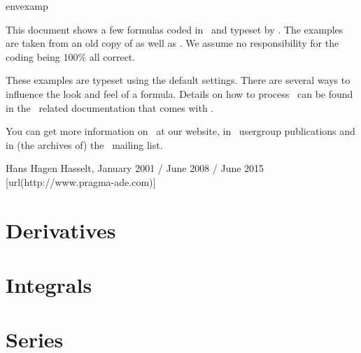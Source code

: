 
\environment envexamp

\startbuffer[colofon]

This document shows a few formulas coded in \MATHML\ and typeset by \CONTEXT. The
examples are taken from an old copy of 
as well as . We assume no
responsibility for the coding being 100\% all correct.

These examples are typeset using the default settings. There are several ways to
influence the look and feel of a formula. Details on how to process \MATHML\ can
be found in the \XML\ related documentation that comes with \CONTEXT.

You can get more information on \CONTEXT\ at our website, in \TEX\ usergroup
publications and in (the archives of) the \CONTEXT\ mailing list.

\blank[2*big]

\startlines
Hans Hagen
Hasselt, January 2001 / June 2008 / June 2015
[url(http://www.pragma-ade.com)]
\stoplines

\stopbuffer

\startdocument
  [color=darkred,
   columns=2,
   title=MathML in \ConTeXt]

\section{Derivatives}


\section{Integrals}


\section{Series}


